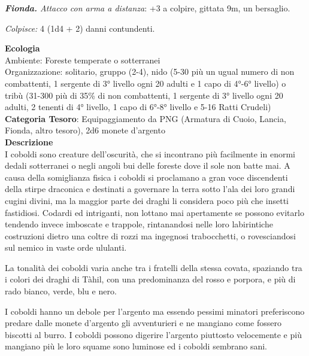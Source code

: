 \begin{multicols}{2}
{\emph{\textbf{Fionda.} Attacco con arma a distanza}: +3 a colpire, gittata 9m, un bersaglio.

\emph{Colpisce:} 4 (1d4 + 2) danni contundenti.

\textbf{Ecologia}\\
Ambiente: Foreste temperate o sotterranei\\
Organizzazione: solitario, gruppo (2-4), nido (5-30 più un ugual numero di non combattenti, 1 sergente di 3° livello ogni 20 adulti e 1 capo di 4°-6° livello) o tribù (31-300 più di 35\% di non combattenti, 1 sergente di 3° livello ogni 20 adulti, 2 tenenti di 4° livello, 1 capo di 6°-8° livello e 5-16 Ratti Crudeli)\\
\textbf{Categoria Tesoro}: Equipaggiamento da PNG (Armatura di Cuoio, Lancia, Fionda, altro tesoro), 2d6 monete d'argento\\
\textbf{Descrizione}\\
I coboldi sono creature dell'oscurità, che si incontrano più facilmente in enormi dedali sotterranei o negli angoli bui delle foreste dove il sole non batte mai. A causa della somiglianza fisica i coboldi si proclamano a gran voce discendenti della stirpe draconica e destinati a governare la terra sotto l'ala dei loro grandi cugini divini, ma la maggior parte dei draghi li considera poco più che insetti fastidiosi. Codardi ed intriganti, non lottano mai apertamente se possono evitarlo tendendo invece imboscate e trappole, rintanandosi nelle loro labirintiche costruzioni dietro una coltre di rozzi ma ingegnosi trabocchetti, o rovesciandosi sul nemico in vaste orde ululanti.

La tonalità dei coboldi varia anche tra i fratelli della stessa covata, spaziando tra i colori dei draghi di Tàhil, con una predominanza del rosso e porpora, e più di rado bianco, verde, blu e nero.

I coboldi hanno un debole per l'argento ma essendo pessimi minatori preferiscono predare dalle monete d'argento gli avventurieri e ne mangiano come fossero biscotti al burro. I coboldi possono digerire l'argento piuttosto velocemente e più mangiano più le loro squame sono luminose ed i coboldi sembrano sani.

}
\end{multicols}
